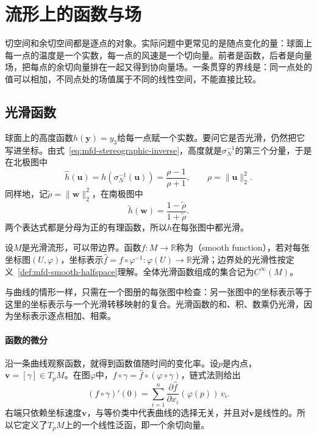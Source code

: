\section{流形上的函数与场}
\label{sec:mfd-functions-fields}

切空间和余切空间都是逐点的对象。实际问题中更常见的是随点变化的量：球面上每一点的温度是一个实数，每一点的风速是一个切向量。前者是函数，后者是向量场，把每点的余切向量排在一起又得到协向量场。一条贯穿的界线是：同一点处的值可以相加，不同点处的场值属于不同的线性空间，不能直接比较。

\subsection{光滑函数}
\label{sec:mfd-smooth-functions}

球面上的高度函数$h(\bm y)=y_3$给每一点赋一个实数。要问它是否光滑，仍然把它写进坐标。由式~\eqref{eq:mfd-stereographic-inverse}，高度就是$\sigma_N^{-1}$的第三个分量，于是在北极图中
\begin{equation}
\hat h(\bm u)=h(\sigma_N^{-1}(\bm u))=\frac{\rho-1}{\rho+1},\qquad \rho=\lVert\bm u\rVert_2^2 .
\label{eq:mfd-height-north}
\end{equation}
同样地，记$\tilde\rho=\lVert\bm w\rVert_2^2$，在南极图中
\begin{equation}
\tilde h(\bm w)=\frac{1-\tilde\rho}{1+\tilde\rho}.
\label{eq:mfd-height-south}
\end{equation}
两个表达式都是分母为正的有理函数，所以$h$在每张图中都光滑。

\begin{definition}[流形上的光滑函数]
\label{def:mfd-smooth-function}
设$M$是光滑流形，可以带边界。函数$f:M\to\mathbb R$称为（smooth function），若对每张坐标图$(U,\varphi)$，坐标表示$\hat f=f\circ\varphi^{-1}:\varphi(U)\to\mathbb R$光滑；边界处的光滑性按定义~\ref{def:mfd-smooth-halfspace}理解。全体光滑函数组成的集合记为$C^\infty(M)$。
\end{definition}

与曲线的情形一样，只需在一个图册的每张图中检查：另一张图中的坐标表示等于这里的坐标表示与一个光滑转移映射的复合。光滑函数的和、积、数乘仍光滑，因为坐标表示逐点相加、相乘。

\paragraph{函数的微分}
沿一条曲线观察函数，就得到函数值随时间的变化率。设$p$是内点，$\bm v=[\gamma]\in T_pM$。在图$\varphi$中，$f\circ\gamma=\hat f\circ(\varphi\circ\gamma)$，链式法则给出
\[
(f\circ\gamma)'(0)=\sum_{i=1}^n\frac{\partial\hat f}{\partial x_i}(\varphi(p))\,v_i .
\]
右端只依赖坐标速度$\bm v$，与等价类中代表曲线的选择无关，并且对$\bm v$是线性的。所以它定义了$T_pM$上的一个线性泛函，即一个余切向量。

